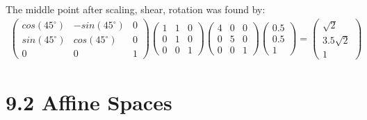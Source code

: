 \documentclass[a4paper]{scrartcl}
\begin{document}
The middle point after scaling, shear, rotation was found by:
\begin{align*}
  \begin{pmatrix} cos(45^\circ) & - sin(45^\circ) & 0 \\ sin(45^\circ) & cos(45^\circ) & 0 \\ 0 & 0 & 1 \end{pmatrix}
  \begin{pmatrix} 1 & 1 & 0 \\ 0 & 1 & 0 \\ 0 & 0 & 1 \end{pmatrix} 
  \begin{pmatrix} 4 & 0 & 0 \\ 0 & 5 & 0 \\ 0 & 0 & 1 \end{pmatrix} 
  \begin{pmatrix} 0.5 \\ 0.5 \\ 1 \end{pmatrix} = \begin{pmatrix} \sqrt{2} \\ 3.5 \sqrt{2} \\ 1 \end{pmatrix}
\end{align*}





\section*{9.2 Affine Spaces}
\end{document}
